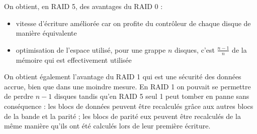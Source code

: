On obtient, en RAID 5, des avantages du RAID 0 :
\begin{itemize}
	\item vitesse d'écriture améliorée car on profite  du contrôleur de chaque disque de manière équivalente 
    \item optimisation de l'espace utilisé, pour une grappe $n$ disques, c'est $\frac{n-1}{n}$ de la mémoire qui est effectivement utilisée
\end{itemize}

On obtient également l'avantage du RAID 1 qui est une sécurité des données accrue, bien que dans une moindre mesure. En RAID 1 on pouvait se permettre de perdre $n-1$ disques tandis qu'en RAID 5 seul 1 peut tomber en panne sans conséquence : les blocs de données peuvent être recalculés grâce aux autres blocs de la bande et la parité ; les blocs de parité eux peuvent être recalculés de la même manière qu'ils ont été calculés lors de leur première écriture. 